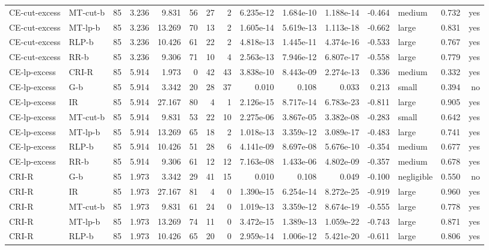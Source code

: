 \begin{table}[htbp]
\begin{tabular}{llrrrrrrrrrrlrr}
CE-cut-excess & MT-cut-b & 85 & 3.236 & 9.831 & 56 & 27 & 2 & 6.235e-12 & 1.684e-10 & 1.188e-14 & -0.464 & medium & 0.732 & yes \\
CE-cut-excess & MT-lp-b & 85 & 3.236 & 13.269 & 70 & 13 & 2 & 1.605e-14 & 5.619e-13 & 1.113e-18 & -0.662 & large & 0.831 & yes \\
CE-cut-excess & RLP-b & 85 & 3.236 & 10.426 & 61 & 22 & 2 & 4.818e-13 & 1.445e-11 & 4.374e-16 & -0.533 & large & 0.767 & yes \\
CE-cut-excess & RR-b & 85 & 3.236 & 9.306 & 71 & 10 & 4 & 2.563e-13 & 7.946e-12 & 6.807e-17 & -0.558 & large & 0.779 & yes \\
CE-lp-excess & CRI-R & 85 & 5.914 & 1.973 & 0 & 42 & 43 & 3.838e-10 & 8.443e-09 & 2.274e-13 & 0.336 & medium & 0.332 & yes \\
CE-lp-excess & G-b & 85 & 5.914 & 3.342 & 20 & 28 & 37 & 0.010 & 0.108 & 0.033 & 0.213 & small & 0.394 & no \\
CE-lp-excess & IR & 85 & 5.914 & 27.167 & 80 & 4 & 1 & 2.126e-15 & 8.717e-14 & 6.783e-23 & -0.811 & large & 0.905 & yes \\
CE-lp-excess & MT-cut-b & 85 & 5.914 & 9.831 & 53 & 22 & 10 & 2.275e-06 & 3.867e-05 & 3.382e-08 & -0.283 & small & 0.642 & yes \\
CE-lp-excess & MT-lp-b & 85 & 5.914 & 13.269 & 65 & 18 & 2 & 1.018e-13 & 3.359e-12 & 3.089e-17 & -0.483 & large & 0.741 & yes \\
CE-lp-excess & RLP-b & 85 & 5.914 & 10.426 & 51 & 28 & 6 & 4.141e-09 & 8.697e-08 & 5.676e-10 & -0.354 & medium & 0.677 & yes \\
CE-lp-excess & RR-b & 85 & 5.914 & 9.306 & 61 & 12 & 12 & 7.163e-08 & 1.433e-06 & 4.802e-09 & -0.357 & medium & 0.678 & yes \\
CRI-R & G-b & 85 & 1.973 & 3.342 & 29 & 41 & 15 & 0.010 & 0.108 & 0.049 & -0.100 & negligible & 0.550 & no \\
CRI-R & IR & 85 & 1.973 & 27.167 & 81 & 4 & 0 & 1.390e-15 & 6.254e-14 & 8.272e-25 & -0.919 & large & 0.960 & yes \\
CRI-R & MT-cut-b & 85 & 1.973 & 9.831 & 61 & 24 & 0 & 1.019e-13 & 3.359e-12 & 8.674e-19 & -0.555 & large & 0.778 & yes \\
CRI-R & MT-lp-b & 85 & 1.973 & 13.269 & 74 & 11 & 0 & 3.472e-15 & 1.389e-13 & 1.059e-22 & -0.743 & large & 0.871 & yes \\
CRI-R & RLP-b & 85 & 1.973 & 10.426 & 65 & 20 & 0 & 2.959e-14 & 1.006e-12 & 5.421e-20 & -0.611 & large & 0.806 & yes \\

\end{tabular}
\end{table}
